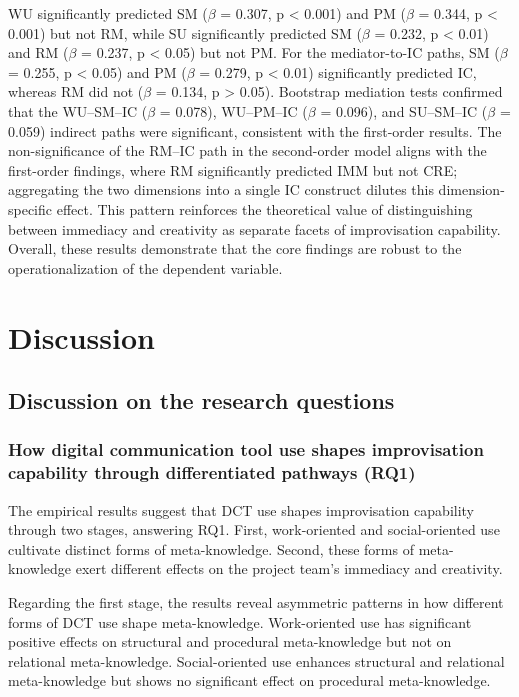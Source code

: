 \documentclass[authoryear,preprint,review,times,10pt]{elsarticle}
\begin{document}
WU significantly predicted SM ($\beta$ = 0.307, p < 0.001) and PM ($\beta$ = 0.344, p < 0.001) but not RM, while SU significantly predicted SM ($\beta$ = 0.232, p < 0.01) and RM ($\beta$ = 0.237, p < 0.05) but not PM. For the mediator-to-IC paths, SM ($\beta$ = 0.255, p < 0.05) and PM ($\beta$ = 0.279, p < 0.01) significantly predicted IC, whereas RM did not ($\beta$ = 0.134, p > 0.05). Bootstrap mediation tests confirmed that the WU--SM--IC ($\beta$ = 0.078), WU--PM--IC ($\beta$ = 0.096), and SU--SM--IC ($\beta$ = 0.059) indirect paths were significant, consistent with the first-order results. The non-significance of the RM--IC path in the second-order model aligns with the first-order findings, where RM significantly predicted IMM but not CRE; aggregating the two dimensions into a single IC construct dilutes this dimension-specific effect. This pattern reinforces the theoretical value of distinguishing between immediacy and creativity as separate facets of improvisation capability. Overall, these results demonstrate that the core findings are robust to the operationalization of the dependent variable.

\section{Discussion}
\subsection{Discussion on the research questions}

\subsubsection{How digital communication tool use shapes improvisation capability through differentiated pathways (RQ1)}
The empirical results suggest that DCT use shapes improvisation capability through two stages, answering RQ1. First, work-oriented and social-oriented use cultivate distinct forms of meta-knowledge. Second, these forms of meta-knowledge exert different effects on the project team's immediacy and creativity.

Regarding the first stage, the results reveal asymmetric patterns in how different forms of DCT use shape meta-knowledge. Work-oriented use has significant positive effects on structural and procedural meta-knowledge but not on relational meta-knowledge. Social-oriented use enhances structural and relational meta-knowledge but shows no significant effect on procedural meta-knowledge.
\end{document}

